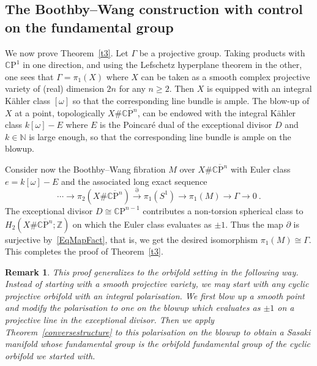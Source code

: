 \documentclass[12pt,leqno]{amsart}
\newcommand{\Z}{\mathbb{Z}}
\newcommand{\CP}{\mathbb{C}\mathrm{P}}
\newcommand{\N}{\mathbb{N}}
\newtheorem{remark}[theor]{Remark}
\begin{document}
\subsection{The Boothby--Wang construction with control on the fundamental group}

We now prove Theorem~\ref{t3}. Let $\Gamma$ be a projective group. 
Taking products with $\CP^1$ in one direction, and using the Lefschetz hyperplane theorem in the other,
one sees that $\Gamma=\pi_1(X)$ where $X$ can be taken as a smooth complex projective variety of (real) dimension $2n$ for any $n\geq 2$. 
Then $X$ is equipped with an integral K\"ahler class $[\omega]$ so that the corresponding line bundle is ample.
The blow-up of $X$ at a point, topologically $X\#\overline{\CP^n}$, can be endowed with the integral K\"ahler class $k[\omega]-E$ where $E$ is the Poincar\'e dual of the exceptional divisor $D$ and $k\in\N$ is large enough, so that the corresponding line bundle is ample on the blowup.

Consider now the Boothby--Wang fibration $M$ over $X\#\overline{\CP^n}$ with Euler class $e=k[\omega]-E$ and the associated long exact sequence
$$
\cdots\longrightarrow\pi_2 (X\#\overline{\CP^n})\stackrel{\partial}{\longrightarrow}\pi_1(S^1)\longrightarrow\pi_1(M)\longrightarrow\Gamma\longrightarrow 0 \ .
$$
The exceptional divisor $D\cong \CP^{n-1}$ contributes a non-torsion spherical class to $H_2(X\#\overline{\CP^n};\Z)$ on which the Euler class evaluates as $\pm 1$. Thus the map $\partial$ is surjective  by~\eqref{EqMapFact}, that is, we get the desired isomorphism 
$\pi_1(M)\cong \Gamma$.
This completes the proof of Theorem~\ref{t3}.

\begin{remark}\label{orbifoldremark}
This proof generalizes to the orbifold setting in the following way. Instead of starting with a smooth projective 
variety, we may start with any cyclic projective orbifold with an integral polarisation.
We first blow up a smooth
point and modify the polarisation to one on the blowup which evaluates as $\pm 1$ on a projective line in the 
exceptional divisor. Then we apply Theorem~\ref{conversestructure} to this polarisation on the blowup to 
obtain a Sasaki manifold whose fundamental group is the orbifold fundamental group of the cyclic orbifold 
we started with.
\end{remark}
\end{document}
